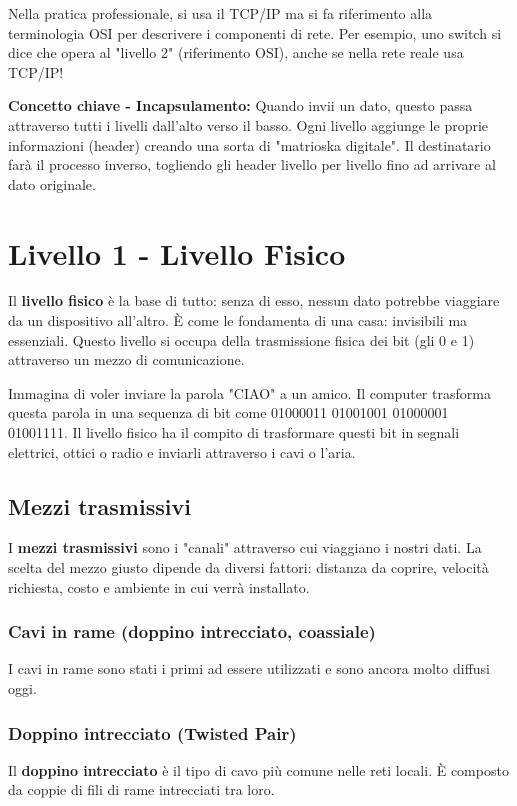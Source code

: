 \documentclass[12pt,a4paper]{article}
\begin{document}
Nella pratica professionale, si usa il TCP/IP ma si fa riferimento alla terminologia OSI per descrivere i componenti di rete. Per esempio, uno switch si dice che opera al "livello 2" (riferimento OSI), anche se nella rete reale usa TCP/IP!

\vspace{0.5cm}
\noindent
\textbf{Concetto chiave - Incapsulamento:} Quando invii un dato, questo passa attraverso tutti i livelli dall'alto verso il basso. Ogni livello aggiunge le proprie informazioni (header) creando una sorta di "matrioska digitale". Il destinatario farà il processo inverso, togliendo gli header livello per livello fino ad arrivare al dato originale.

\section{Livello 1 - Livello Fisico}

Il \textbf{livello fisico} è la base di tutto: senza di esso, nessun dato potrebbe viaggiare da un dispositivo all'altro. È come le fondamenta di una casa: invisibili ma essenziali. Questo livello si occupa della trasmissione fisica dei bit (gli 0 e 1) attraverso un mezzo di comunicazione.

Immagina di voler inviare la parola "CIAO" a un amico. Il computer trasforma questa parola in una sequenza di bit come 01000011 01001001 01000001 01001111. Il livello fisico ha il compito di trasformare questi bit in segnali elettrici, ottici o radio e inviarli attraverso i cavi o l'aria.

\subsection{Mezzi trasmissivi}

I \textbf{mezzi trasmissivi} sono i "canali" attraverso cui viaggiano i nostri dati. La scelta del mezzo giusto dipende da diversi fattori: distanza da coprire, velocità richiesta, costo e ambiente in cui verrà installato.

\subsubsection{Cavi in rame (doppino intrecciato, coassiale)}

I cavi in rame sono stati i primi ad essere utilizzati e sono ancora molto diffusi oggi.

\subsubsection*{Doppino intrecciato (Twisted Pair)}
Il \textbf{doppino intrecciato} è il tipo di cavo più comune nelle reti locali. È composto da coppie di fili di rame intrecciati tra loro.
\end{document}
